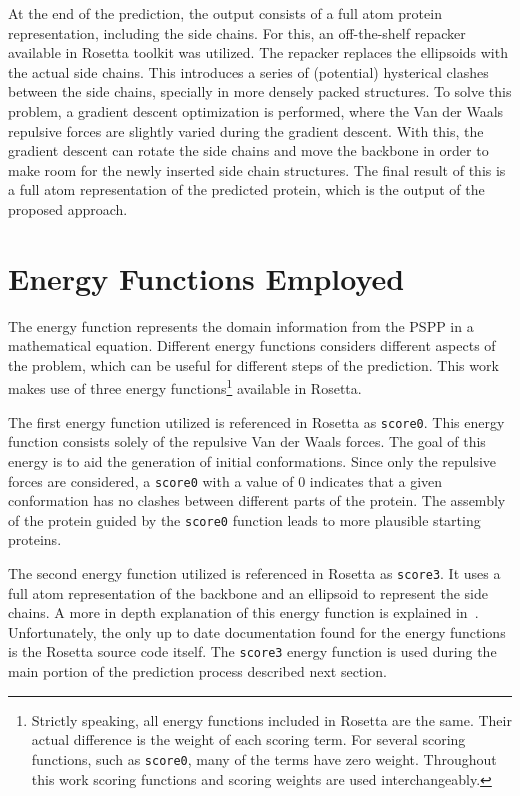 At the end of the prediction, the output consists of a full atom protein
representation, including the side chains. For this, an off-the-shelf repacker
available in Rosetta toolkit was utilized.  The repacker replaces the
ellipsoids with the actual side chains. This introduces a series of (potential)
hysterical clashes between the side chains, specially in more densely packed
structures. To solve this problem, a gradient descent optimization is
performed, where the Van der Waals repulsive forces are slightly varied during
the gradient descent.  With this, the gradient descent can rotate the side
chains and move the backbone in order to make room for the newly inserted side
chain structures.  The final result of this is a full atom representation of
the predicted protein, which is the output of the proposed approach.

\section{Energy Functions Employed}
\label{sec:energy-function}

The energy function represents the domain information from the \ac{PSPP} in a
mathematical equation. Different energy functions considers different aspects
of the problem, which can be useful for different steps of the prediction. This
work makes use of three energy functions\footnote{Strictly speaking, all energy
functions included in Rosetta are the same. Their actual difference is the
weight of each scoring term. For several scoring functions, such as
\texttt{score0}, many of the terms have zero weight. Throughout this work
scoring functions and scoring weights are used interchangeably.} available in
Rosetta.

The first energy function utilized is referenced in Rosetta as \texttt{score0}. This
energy function consists solely of the repulsive Van der Waals forces. The goal
of this energy is to aid the generation of initial conformations. Since only
the repulsive forces are considered, a \texttt{score0} with a value of $0$ indicates
that a given conformation has no clashes between different parts of the
protein. The assembly of the protein guided by the \texttt{score0} function leads to
more plausible starting proteins.

The second energy function utilized is referenced in Rosetta as \texttt{score3}. It uses
a full atom representation of the backbone and an ellipsoid to represent the
side chains. A more in depth explanation of this energy function is explained
in~\cite{alford2017rosetta}. Unfortunately, the only up to date documentation
found for the energy functions is the Rosetta source code itself.  The \texttt{score3}
energy function is used during the main portion of the prediction process
described next section.

